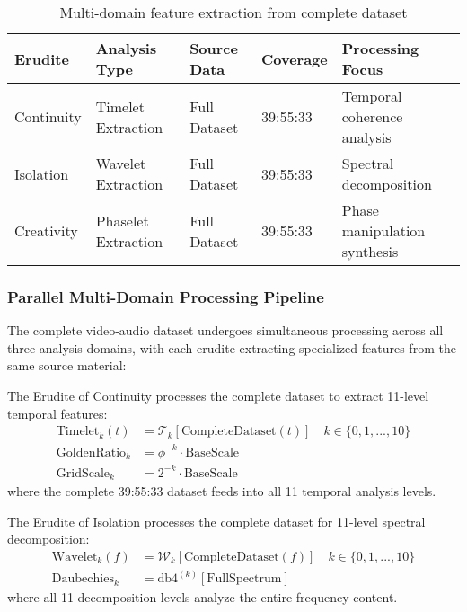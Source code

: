 \begin{table}[h]
\centering
\begin{tabular}{|l|l|l|l|l|}
\hline
\textbf{Erudite} & \textbf{Analysis Type} & \textbf{Source Data} & \textbf{Coverage} & \textbf{Processing Focus} \\
\hline
Continuity & Timelet Extraction & Full Dataset & 39:55:33 & Temporal coherence analysis \\
\hline
Isolation & Wavelet Extraction & Full Dataset & 39:55:33 & Spectral decomposition \\
\hline
Creativity & Phaselet Extraction & Full Dataset & 39:55:33 & Phase manipulation synthesis \\
\hline
\end{tabular}
\caption{Multi-domain feature extraction from complete dataset}
\end{table}

\subsubsection{Parallel Multi-Domain Processing Pipeline}

The complete video-audio dataset undergoes simultaneous processing across all three analysis domains, with each erudite extracting specialized features from the same source material:

\begin{definition}
The Erudite of Continuity processes the complete dataset to extract 11-level temporal features:
\begin{align}
\text{Timelet}_{k}(t) &= \mathcal{T}_k[\text{CompleteDataset}(t)] \quad k \in \{0,1,...,10\} \\
\text{GoldenRatio}_{k} &= \phi^{-k} \cdot \text{BaseScale} \\
\text{GridScale}_{k} &= 2^{-k} \cdot \text{BaseScale}
\end{align}
where the complete 39:55:33 dataset feeds into all 11 temporal analysis levels.
\end{definition}

\begin{definition}
The Erudite of Isolation processes the complete dataset for 11-level spectral decomposition:
\begin{align}
\text{Wavelet}_{k}(f) &= \mathcal{W}_k[\text{CompleteDataset}(f)] \quad k \in \{0,1,...,10\} \\
\text{Daubechies}_{k} &= \text{db4}^{(k)}[\text{FullSpectrum}]
\end{align}
where all 11 decomposition levels analyze the entire frequency content.
\end{definition}

